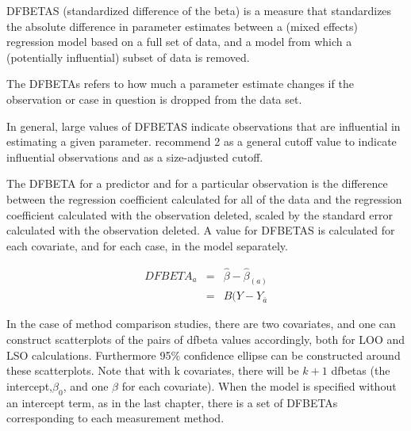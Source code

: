 \documentclass[12pt, a4paper]{report}
\theoremstyle{plain}
\theoremstyle{definition}
\theoremstyle{remark}
\begin{document}
	
	DFBETAS (standardized difference of the beta) is a measure that standardizes the absolute difference in parameter estimates between a (mixed effects) regression model based on a full set of data, and a model from which a (potentially influential) subset of data is removed.
	
	
	The DFBETAs refers to how much a parameter estimate changes if the observation or case in question is dropped from the data set.

	In general, large values of DFBETAS indicate observations that are influential in estimating a given parameter. \citet{belsley2005} recommend 2 as a general cutoff value to indicate influential observations and  as a size-adjusted cutoff.
	
	
	The DFBETA for a predictor and for a particular observation is the difference between the regression coefficient calculated for all of the data and the regression coefficient calculated with the observation deleted, scaled by the standard error calculated with the observation deleted.
	A value for DFBETAS is calculated for each covariate, and for each case, in the model separately.
	
	
	
	\begin{eqnarray}
	DFBETA_{a} &=& \hat{\beta} - \hat{\beta}_{(a)} \\
	&=& B(Y-Y_{\bar{a}}
	\end{eqnarray}
	
	In the case of method comparison studies, there are two covariates, and one can construct scatterplots of the pairs of dfbeta values accordingly, both for LOO and LSO calculations. Furthermore 95\% confidence ellipse can be constructed around these scatterplots.
	Note that with k covariates, there will be $k+1$ dfbetas (the intercept,$\beta_0$, and one $\beta$ for each covariate). When the model is specified without an intercept term, as in the last chapter, there is a set of DFBETAs corresponding to each measurement method.
	
	
	
	
\end{document}
